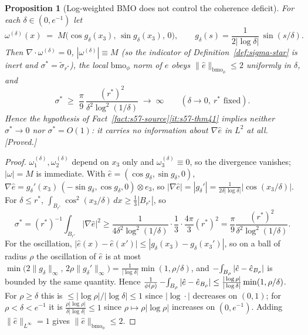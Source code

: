 \documentclass[11pt]{article}
\newtheorem{proposition}[theorem]{Proposition}
\theoremstyle{definition}
\theoremstyle{remark}
\newcommand{\Xint}{\mathop{\mathchoice{\vcenter{\hbox{$\displaystyle-$}}}%
  {\vcenter{\hbox{$\textstyle-$}}}%
  {\vcenter{\hbox{$\scriptstyle-$}}}%
  {\vcenter{\hbox{$\scriptscriptstyle-$}}}}\!\int}
\providecommand{\fint}{\Xint}
\begin{document}
\begin{proposition}[Log-weighted BMO does not control the coherence deficit]
  \label{prop:s57-no-gradient}
  For each $\delta\in(0,e^{-1})$ let
  \[
    \omega^{(\delta)}(x)\;=\;M\bigl(\cos g_\delta(x_3),\,
      \sin g_\delta(x_3),\,0\bigr),
    \qquad g_\delta(s)=\frac{1}{2|\log\delta|}\,\sin(s/\delta).
  \]
  Then $\nabla\cdot\omega^{(\delta)}=0$, $|\omega^{(\delta)}|\equiv M$ (so the
  indicator of Definition~\ref{def:sigma-star} is inert and
  $\sigma^*=\tilde\sigma_{r^*}$), the local $\mathrm{bmo}_\phi$ norm of
  $\hat e$ obeys $\|\hat e\|_{\mathrm{bmo}_\phi}\leq 2$ uniformly in $\delta$,
  and
  \[
    \sigma^*\;\geq\;\frac{\pi}{9}\,
      \frac{(r^*)^2}{\delta^2\log^2(1/\delta)}\;\longrightarrow\;\infty
    \qquad(\delta\to0,\ r^*\text{ fixed}).
  \]
  Hence the hypothesis of Fact~\ref{fact:s57-source}\ref{it:s57-thm41}
  implies neither $\sigma^*\to0$ nor $\sigma^*=O(1)$: it carries no
  information about $\nabla\hat e$ in $L^2$ at all. \emph{[Proved.]}
\end{proposition}
\begin{proof}
  $\omega^{(\delta)}_1,\omega^{(\delta)}_2$ depend on $x_3$ only and
  $\omega^{(\delta)}_3\equiv0$, so the divergence vanishes; $|\omega|=M$ is
  immediate. With $\hat e=(\cos g_\delta,\sin g_\delta,0)$,
  $\nabla\hat e=g_\delta'(x_3)\,(-\sin g_\delta,\cos g_\delta,0)\otimes e_3$,
  so $|\nabla\hat e|=|g_\delta'|=\frac{1}{2\delta|\log\delta|}
  |\cos(x_3/\delta)|$. For $\delta\leq r^*$,
  $\int_{B_{r^*}}\cos^2(x_3/\delta)\,dx\geq\tfrac13|B_{r^*}|$, so
  \[
    \sigma^*=(r^*)^{-1}\!\!\int_{B_{r^*}}\!\!|\nabla\hat e|^2
    \geq\frac{1}{4\delta^2\log^2(1/\delta)}\cdot\frac{1}{3}\cdot
      \frac{4\pi}{3}(r^*)^2
    =\frac{\pi}{9}\frac{(r^*)^2}{\delta^2\log^2(1/\delta)} .
  \]
  For the oscillation, $|\hat e(x)-\hat e(x')|\leq|g_\delta(x_3)-
  g_\delta(x_3')|$, so on a ball of radius $\rho$ the oscillation of $\hat e$
  is at most $\min\bigl(2\|g_\delta\|_\infty,\,
  2\rho\|g_\delta'\|_\infty\bigr)
  =\frac{1}{|\log\delta|}\min(1,\rho/\delta)$, and
  $\fint_{B_\rho}|\hat e-\hat e_{B_\rho}|$ is bounded by the same quantity.
  Hence
  $\frac{1}{\phi(\rho)}\fint_{B_\rho}|\hat e-\hat e_{B_\rho}|
  \leq\frac{|\log\rho|}{|\log\delta|}\min(1,\rho/\delta)$. For
  $\rho\geq\delta$ this is $\leq|\log\rho|/|\log\delta|\leq1$ since
  $|\log\cdot|$ decreases on $(0,1)$; for $\rho<\delta<e^{-1}$ it is
  $\frac{\rho|\log\rho|}{\delta|\log\delta|}\leq1$ since $\rho\mapsto
  \rho|\log\rho|$ increases on $(0,e^{-1})$. Adding
  $\|\hat e\|_{L^\infty}=1$ gives $\|\hat e\|_{\mathrm{bmo}_\phi}\leq2$.
\end{proof}
\end{document}
